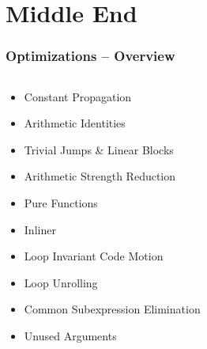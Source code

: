 \documentclass[navbaroff,en]{sdqbeamer}
\begin{document}
\section{Middle End}


\begin{frame}
	\frametitle{Optimizations -- Overview}

	\begin{columns}
		\begin{column}{0.48\textwidth}
			\begin{itemize}
				\item Constant Propagation
				\item Arithmetic Identities
				\item Trivial Jumps \& Linear Blocks
				\item Arithmetic Strength Reduction
				\item Pure Functions
				\item Inliner
				\item Loop Invariant Code Motion
				\item Loop Unrolling
				\item Common Subexpression Elimination

				\vspace{1em}

				\item Unused Arguments
			\end{itemize}
		\end{column}
		\begin{column}{0.48\textwidth}
			


\end{column}
\end{columns}
\end{frame}
\end{document}
